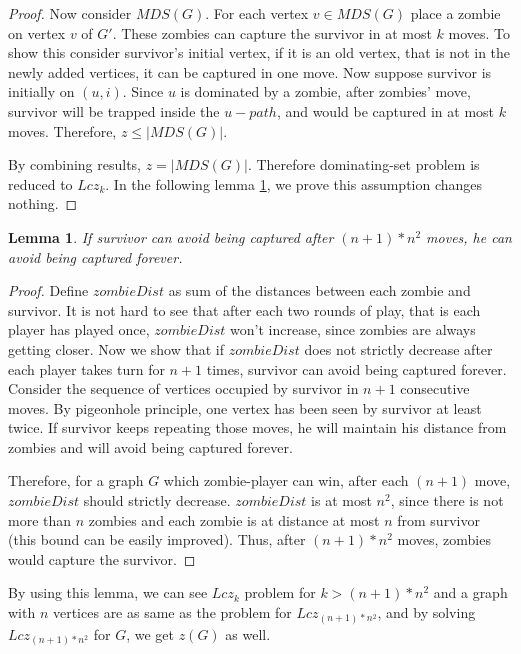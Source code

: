 \documentclass[1p]{elsarticle}
\newtheorem{lemma}[theorem]{Lemma}
\begin{document}
\begin{proof}
		Now consider $MDS(G)$. For each vertex $v \in MDS(G)$ place a zombie on vertex $v$ of $G'$. These zombies can
		capture the survivor in at most $k$ moves. To show this consider survivor's initial vertex, if it is an old
		vertex, that is not in the newly added vertices, it can be captured in one move. Now suppose survivor is
		initially on $(u,i)$. Since $u$ is dominated by a zombie, after zombies' move, survivor will be trapped inside
		the $u-path$, and would be captured in at most $k$ moves. Therefore, $z \leq |MDS(G)|$.

		By combining results, $z = |MDS(G)|$. Therefore dominating-set problem is reduced to $Lcz_k$. In the following
		lemma \ref{limit-moves}, we prove this assumption changes nothing.

	\end{proof}

	\begin{lemma}
		\label{limit-moves}
		If survivor can avoid being captured after $(n + 1) * n^2$ moves, he can avoid being captured forever.
	\end{lemma}
	\begin{proof}
		Define $zombieDist$ as sum of the distances between each zombie and survivor. It is not hard to see that after
		each two rounds of play, that is each player has played once, $zombieDist$ won't increase, since zombies are
		always getting closer. Now we show that if $zombieDist$ does not strictly decrease after each player takes turn
		for $n + 1$ times, survivor can avoid being captured forever. Consider the sequence of vertices occupied by
		survivor in $n + 1$ consecutive moves. By pigeonhole principle, one vertex has been seen by survivor at least
		twice. If survivor keeps repeating those moves, he will maintain his distance from zombies and will avoid being
		captured forever.

		Therefore, for a graph $G$ which zombie-player can win, after each $(n + 1)$ move, $zombieDist$ should strictly
		decrease. $zombieDist$ is at most $n^2$, since there is not more than $n$ zombies and each zombie is at distance
		at most $n$ from survivor (this bound can be easily improved). Thus, after $(n + 1) * n^2$ moves, zombies would
		capture the survivor.
	\end{proof}

	By using this lemma, we can see $Lcz_k$ problem for $k > (n + 1) * n^2$ and a graph with $n$ vertices are as same as
	the problem for $Lcz_{(n + 1) * n^2}$, and by solving $Lcz_{(n + 1) * n^2}$ for $G$, we get $z(G)$ as well.
\end{document}
